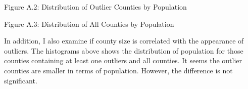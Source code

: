 \documentclass{article}
\begin{document}
\pagebreak

\begin{center}
Figure A.2: Distribution of Outlier Counties by Population\\
\noindent
{}
\end{center}

\begin{center}
Figure A.3: Distribution of All Counties by Population\\
\noindent
{}
\end{center}

In addition, I also examine if county size is correlated with the appearance of outliers. The histograms above shows the distribution of population for those counties containing at least one outliers and all counties. It seems the outlier counties are smaller in terms of population. However, the difference is not significant. 

\pagebreak
\end{document}
